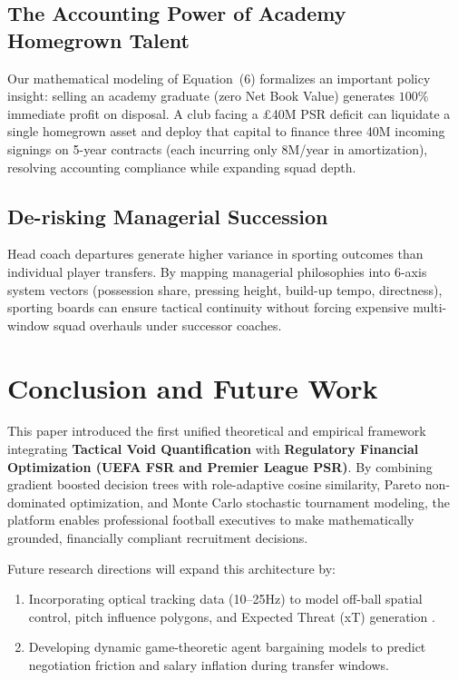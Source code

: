 \documentclass[10pt,journal,compsoc]{IEEEtran}
\begin{document}
\subsection{The Accounting Power of Academy Homegrown Talent}
Our mathematical modeling of Equation~(6) formalizes an important policy insight: selling an academy graduate (zero Net Book Value) generates $100\%$ immediate profit on disposal. A club facing a \pounds40M PSR deficit can liquidate a single homegrown asset and deploy that capital to finance three \texteuro40M incoming signings on 5-year contracts (each incurring only \texteuro8M/year in amortization), resolving accounting compliance while expanding squad depth.

\subsection{De-risking Managerial Succession}
Head coach departures generate higher variance in sporting outcomes than individual player transfers. By mapping managerial philosophies into 6-axis system vectors (possession share, pressing height, build-up tempo, directness), sporting boards can ensure tactical continuity without forcing expensive multi-window squad overhauls under successor coaches.

\section{Conclusion and Future Work}
\label{sec:conclusion}
This paper introduced the first unified theoretical and empirical framework integrating \textbf{Tactical Void Quantification} with \textbf{Regulatory Financial Optimization (UEFA FSR and Premier League PSR)}. By combining gradient boosted decision trees with role-adaptive cosine similarity, Pareto non-dominated optimization, and Monte Carlo stochastic tournament modeling, the platform enables professional football executives to make mathematically grounded, financially compliant recruitment decisions.

Future research directions will expand this architecture by:
\begin{enumerate}
    \item Incorporating optical tracking data (10–25Hz) to model off-ball spatial control, pitch influence polygons, and Expected Threat (xT) generation \cite{fernandez2018wide, singh2019introducing, spearman2018beyond}.
    \item Developing dynamic game-theoretic agent bargaining models to predict negotiation friction and salary inflation during transfer windows.
\end{enumerate}
\end{document}
